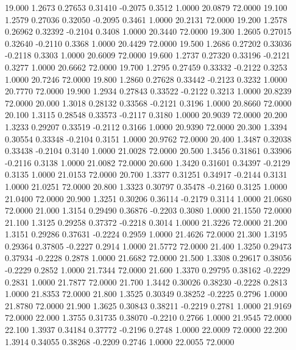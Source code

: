   19.000   1.2673   0.27653   0.31410  -0.2075   0.3512   1.0000  20.0879  72.0000
  19.100   1.2579   0.27036   0.32050  -0.2095   0.3461   1.0000  20.2131  72.0000
  19.200   1.2578   0.26962   0.32392  -0.2104   0.3408   1.0000  20.3440  72.0000
  19.300   1.2605   0.27015   0.32640  -0.2110   0.3368   1.0000  20.4429  72.0000
  19.500   1.2686   0.27202   0.33036  -0.2118   0.3303   1.0000  20.6009  72.0000
  19.600   1.2737   0.27320   0.33196  -0.2121   0.3277   1.0000  20.6662  72.0000
  19.700   1.2795   0.27459   0.33332  -0.2122   0.3253   1.0000  20.7246  72.0000
  19.800   1.2860   0.27628   0.33442  -0.2123   0.3232   1.0000  20.7770  72.0000
  19.900   1.2934   0.27843   0.33522  -0.2122   0.3213   1.0000  20.8239  72.0000
  20.000   1.3018   0.28132   0.33568  -0.2121   0.3196   1.0000  20.8660  72.0000
  20.100   1.3115   0.28548   0.33573  -0.2117   0.3180   1.0000  20.9039  72.0000
  20.200   1.3233   0.29207   0.33519  -0.2112   0.3166   1.0000  20.9390  72.0000
  20.300   1.3394   0.30554   0.33348  -0.2104   0.3151   1.0000  20.9762  72.0000
  20.400   1.3487   0.32038   0.33438  -0.2104   0.3140   1.0000  21.0028  72.0000
  20.500   1.3456   0.31861   0.33906  -0.2116   0.3138   1.0000  21.0082  72.0000
  20.600   1.3420   0.31601   0.34397  -0.2129   0.3135   1.0000  21.0153  72.0000
  20.700   1.3377   0.31251   0.34917  -0.2144   0.3131   1.0000  21.0251  72.0000
  20.800   1.3323   0.30797   0.35478  -0.2160   0.3125   1.0000  21.0400  72.0000
  20.900   1.3251   0.30206   0.36114  -0.2179   0.3114   1.0000  21.0680  72.0000
  21.000   1.3154   0.29490   0.36876  -0.2203   0.3080   1.0000  21.1550  72.0000
  21.100   1.3125   0.29258   0.37372  -0.2218   0.3014   1.0000  21.3226  72.0000
  21.200   1.3151   0.29286   0.37631  -0.2224   0.2959   1.0000  21.4626  72.0000
  21.300   1.3195   0.29364   0.37805  -0.2227   0.2914   1.0000  21.5772  72.0000
  21.400   1.3250   0.29473   0.37934  -0.2228   0.2878   1.0000  21.6682  72.0000
  21.500   1.3308   0.29617   0.38056  -0.2229   0.2852   1.0000  21.7344  72.0000
  21.600   1.3370   0.29795   0.38162  -0.2229   0.2831   1.0000  21.7877  72.0000
  21.700   1.3442   0.30026   0.38230  -0.2228   0.2813   1.0000  21.8353  72.0000
  21.800   1.3525   0.30349   0.38252  -0.2225   0.2796   1.0000  21.8780  72.0000
  21.900   1.3625   0.30843   0.38211  -0.2219   0.2781   1.0000  21.9169  72.0000
  22.000   1.3755   0.31735   0.38070  -0.2210   0.2766   1.0000  21.9545  72.0000
  22.100   1.3937   0.34184   0.37772  -0.2196   0.2748   1.0000  22.0009  72.0000
  22.200   1.3914   0.34055   0.38268  -0.2209   0.2746   1.0000  22.0055  72.0000
